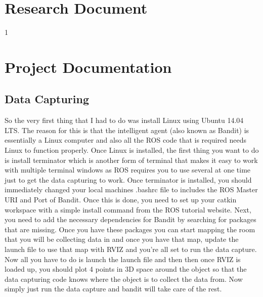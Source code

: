 \documentclass[draftclsnofoot, onecolumn, 10pt, compsoc]{IEEEtran}
\begin{document}
\newpage

\section{Research Document}
	1      \newpage


\section{Project Documentation}
\subsection{Data Capturing}
	So the very first thing that I had to do was install Linux using Ubuntu 14.04 LTS. The reason for this is that the intelligent agent (also known as Bandit) is essentially a Linux computer and also all the ROS code that is required needs Linux to function properly. Once Linux is installed, the first thing you want to do is install terminator which is another form of terminal that makes it easy to work with multiple terminal windows as ROS requires you to use several at one time just to get the data capturing to work. Once terminator is installed, you should immediately changed your local machines .bashrc file to includes the ROS Master URI and Port of Bandit. Once this is done, you need to set up your catkin workspace with a simple install command from the ROS tutorial website. Next, you need to add the necessary dependencies for Bandit by searching for packages that are missing. Once you have these packages you can start mapping the room that you will be collecting data in and once you have that map, update the launch file to use that map with RVIZ and you’re all set to run the data capture. Now all you have to do is launch the launch file and then then once RVIZ is loaded up, you should plot 4 points in 3D space around the object so that the data capturing code knows where the object is to collect the data from. Now simply just run the data capture and bandit will take care of the rest.
    
\end{document}
